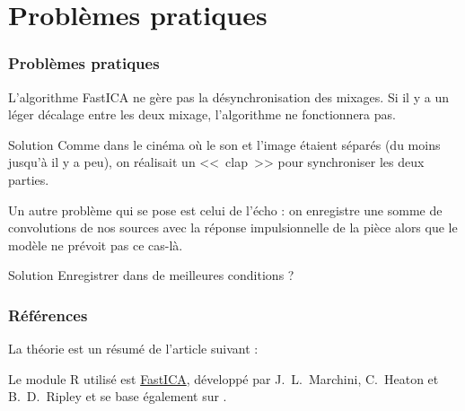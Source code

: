 \documentclass[compress]{beamer}
\begin{document}
\section{Problèmes pratiques}
\begin{frame}
	\frametitle{Problèmes pratiques}
	L'algorithme FastICA ne gère pas la désynchronisation des mixages.
	Si il y a un léger décalage entre les deux mixage, l'algorithme ne
	fonctionnera pas.
	\pause
	
	\begin{block}{Solution}
	Comme dans le cinéma où le son et l'image étaient séparés (du moins
	jusqu'à il y a peu), on réalisait un <<~clap~>> pour synchroniser
	les deux parties.
	\end{block}
	\pause

	Un autre problème qui se pose est celui de l'écho : on enregistre une
	somme de convolutions de nos sources avec la réponse impulsionnelle de
	la pièce alors que le modèle ne prévoit pas ce cas-là.
	\pause
	
	\begin{block}{Solution}
	Enregistrer dans de meilleures conditions ?
	\end{block}
\end{frame}


\appendix
\begin{frame}
	\frametitle{Références}
	La théorie est un résumé de l'article suivant :
	
	\vspace{2em}

	Le module R utilisé est
	\href{https://cran.r-project.org/web/packages/fastICA/}{FastICA},
	développé par J.~L.~Marchini, C.~Heaton et B.~D.~Ripley et
	se base également sur \cite{hyv}.
\end{frame}
\end{document}
